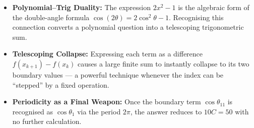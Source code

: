 \begin{takeaways}
\begin{itemize}[leftmargin=*]
  \item \textbf{Polynomial–Trig Duality:} The expression $2x^2 - 1$ is the algebraic form of the double-angle formula $\cos(2\theta) = 2\cos^2\theta - 1$. Recognising this connection converts a polynomial question into a telescoping trigonometric sum.
  \item \textbf{Telescoping Collapse:} Expressing each term as a difference $f(x_{k+1}) - f(x_k)$ causes a large finite sum to instantly collapse to its two boundary values — a powerful technique whenever the index can be ``stepped'' by a fixed operation.
  \item \textbf{Periodicity as a Final Weapon:} Once the boundary term $\cos\theta_{11}$ is recognised as $\cos\theta_1$ via the period $2\pi$, the answer reduces to $10C = 50$ with no further calculation.
\end{itemize}
\end{takeaways}
